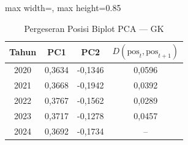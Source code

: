 \begin{table}[H]
\centering
\caption{Pergeseran Posisi Biplot PCA --- GK} \label{tab:appjarak_pca_loading_gk}
\begin{adjustbox}{max width=\textwidth, max height=0.85\textheight}
\begin{tabular}{|c|c|c|c|}
\hline
\textbf{Tahun} & \textbf{PC1} & \textbf{PC2} & \textbf{$D(\text{pos}_t, \text{pos}_{t+1})$} \\
\hline
2020 & 0,3634 & -0,1346 & 0,0596 \\
2021 & 0,3668 & -0,1942 & 0,0392 \\
2022 & 0,3767 & -0,1562 & 0,0289 \\
2023 & 0,3717 & -0,1278 & 0,0457 \\
2024 & 0,3692 & -0,1734 & -- \\
\hline
\end{tabular}
\end{adjustbox}
\end{table}
